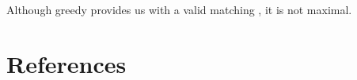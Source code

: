 \documentclass{article}
\begin{document}
Although greedy provides us with a valid matching , it is not maximal.

\section{References}


\end{document}
